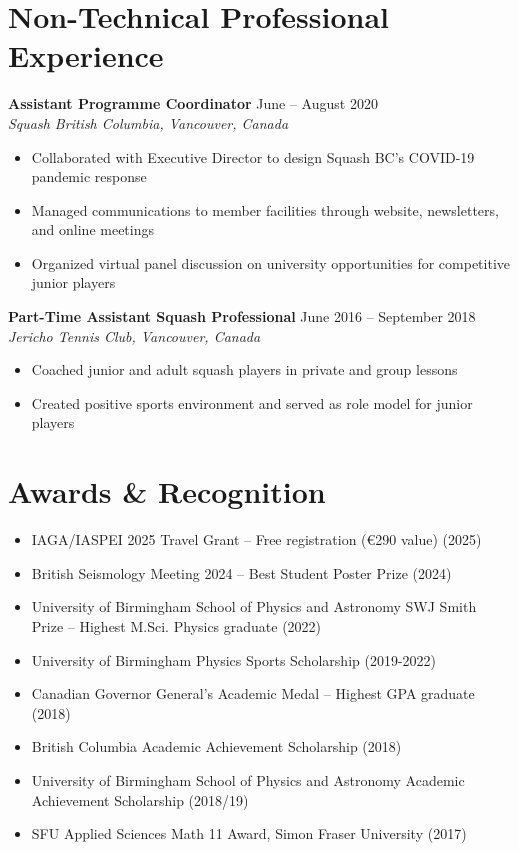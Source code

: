\documentclass[11pt,a4paper]{article}
\newcommand{\cventry}[4]{%
    \noindent\textbf{#1} \hfill #2\\
    \textit{#3} \hfill #4\\[0.1em]
}
\begin{document}
\section*{Non-Technical Professional Experience}

\cventry{Assistant Programme Coordinator}{June -- August 2020}{Squash British Columbia, Vancouver, Canada}{}
\begin{itemize}
    \item Collaborated with Executive Director to design Squash BC's COVID-19 pandemic response
    \item Managed communications to member facilities through website, newsletters, and online meetings
    \item Organized virtual panel discussion on university opportunities for competitive junior players
\end{itemize}

\cventry{Part-Time Assistant Squash Professional}{June 2016 -- September 2018}{Jericho Tennis Club, Vancouver, Canada}{}
\begin{itemize}
    \item Coached junior and adult squash players in private and group lessons
    \item Created positive sports environment and served as role model for junior players
\end{itemize}

\section*{Awards \& Recognition}

\begin{itemize}
    \item IAGA/IASPEI 2025 Travel Grant -- Free registration (€290 value) (2025)
    \item British Seismology Meeting 2024 -- Best Student Poster Prize (2024)
    \item University of Birmingham School of Physics and Astronomy SWJ Smith Prize -- Highest M.Sci. Physics graduate (2022)
    \item University of Birmingham Physics Sports Scholarship (2019-2022)
    \item Canadian Governor General's Academic Medal -- Highest GPA graduate (2018)
    \item British Columbia Academic Achievement Scholarship (2018)
    \item University of Birmingham School of Physics and Astronomy Academic Achievement Scholarship (2018/19)
    \item SFU Applied Sciences Math 11 Award, Simon Fraser University (2017)
\end{itemize}
\end{document}
